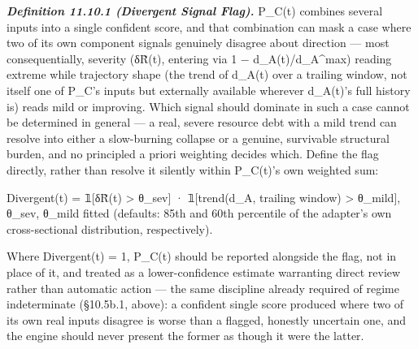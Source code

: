 \documentclass[
]{article}
\begin{document}
\emph{\textbf{Definition 11.10.1 (Divergent Signal Flag).}} P\_C(t)
combines several inputs into a single confident score, and that
combination can mask a case where two of its own component signals
genuinely disagree about direction --- most consequentially, severity
(δR̃(t), entering via 1 − d\_A(t)/d\_A\^{}max) reading extreme while
trajectory shape (the trend of d\_A(t) over a trailing window, not
itself one of P\_C's inputs but externally available wherever d\_A(t)'s
full history is) reads mild or improving. Which signal should dominate
in such a case cannot be determined in general --- a real, severe
resource debt with a mild trend can resolve into either a slow-burning
collapse or a genuine, survivable structural burden, and no principled a
priori weighting decides which. Define the flag directly, rather than
resolve it silently within P\_C(t)'s own weighted sum:

Divergent(t) = 𝟙{[}δR̃(t) \textgreater{} θ\_sev{]} · 𝟙{[}trend(d\_A,
trailing window) \textgreater{} θ\_mild{]}, θ\_sev, θ\_mild fitted
(defaults: 85th and 60th percentile of the adapter's own cross-sectional
distribution, respectively).

Where Divergent(t) = 1, P\_C(t) should be reported alongside the flag,
not in place of it, and treated as a lower-confidence estimate
warranting direct review rather than automatic action --- the same
discipline already required of regime indeterminate (§10.5b.1, above): a
confident single score produced where two of its own real inputs
disagree is worse than a flagged, honestly uncertain one, and the engine
should never present the former as though it were the latter.
\end{document}
